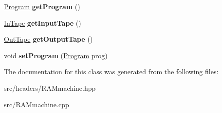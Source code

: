 \begin{DoxyCompactItemize}
\item 
\hypertarget{classRAMmachine_a9ec0b4a2dac71d87bdfa662d1e0a11d6}{\hyperlink{classProgram}{Program} {\bfseries get\-Program} ()}\label{classRAMmachine_a9ec0b4a2dac71d87bdfa662d1e0a11d6}

\item 
\hypertarget{classRAMmachine_ab366057d4a54d9d0acd2b7a89612af9a}{\hyperlink{classInTape}{In\-Tape} {\bfseries get\-Input\-Tape} ()}\label{classRAMmachine_ab366057d4a54d9d0acd2b7a89612af9a}

\item 
\hypertarget{classRAMmachine_a6a2999d602c5c88391c4dc4e39916c1d}{\hyperlink{classOutTape}{Out\-Tape} {\bfseries get\-Output\-Tape} ()}\label{classRAMmachine_a6a2999d602c5c88391c4dc4e39916c1d}

\item 
\hypertarget{classRAMmachine_ac28a9d66c715f606a3cf30259edbf115}{void {\bfseries set\-Program} (\hyperlink{classProgram}{Program} prog)}\label{classRAMmachine_ac28a9d66c715f606a3cf30259edbf115}

\end{DoxyCompactItemize}


The documentation for this class was generated from the following files\-:\begin{DoxyCompactItemize}
\item 
src/headers/R\-A\-Mmachine.\-hpp\item 
src/R\-A\-Mmachine.\-cpp\end{DoxyCompactItemize}
